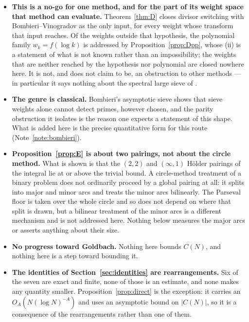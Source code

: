 \documentclass[11pt,a4paper]{article}
\theoremstyle{plain}
\theoremstyle{definition}
\theoremstyle{remark}
\begin{document}
\begin{itemize}
\item \textbf{This is a no-go for one method, and for the part of its
weight space that method can evaluate.} Theorem~\ref{thm:D}
closes divisor switching with Bombieri--Vinogradov as the only input,
for every weight whose transform that input reaches. Of the weights
outside that hypothesis, the polynomial family $w_k=f(\log k)$ is
addressed by Proposition~\ref{prop:Dpp}, whose (ii) is a statement of
what is not known rather than an impossibility; the weights that are
neither reached by the hypothesis nor polynomial are closed nowhere
here. It is not, and does not
claim to be, an obstruction to other methods --- in particular it says
nothing about the spectral large sieve of \cite{Li23}.

\item \textbf{The genre is classical.} Bombieri's asymptotic sieve
\cite{Bom76} shows that sieve weights alone cannot detect primes,
however chosen, and the parity obstruction it isolates is the reason
one expects a statement of this shape. What is added here is the
precise quantitative form for this route
(Note~\ref{note:bombieri}).

\item \textbf{Proposition~\ref{prop:E} is about two pairings, not
about the circle method.} What is shown is that the $(2,2)$ and
$(\infty,1)$ H\"older pairings of the integral lie at or above the
trivial bound. A circle-method treatment of a binary problem does not
ordinarily proceed by a global pairing at all: it splits into major and
minor arcs and treats the minor arcs bilinearly. The Parseval floor is
taken over the whole circle and so does not depend on where that split
is drawn, but a bilinear treatment of the minor arcs is a different
mechanism and is not addressed here. Nothing below measures the major
arcs or asserts anything about their size.

\item \textbf{No progress toward Goldbach.} Nothing here bounds
$C(N)$, and nothing here is a step toward bounding it.

\item \textbf{The identities of Section~\ref{sec:identities} are
rearrangements.} Six of the seven are exact and finite, none of those
is an estimate, and none makes any quantity smaller.
Proposition~\ref{prop:direct} is the exception: it carries an
$O_A(N(\log N)^{-A})$ and uses an asymptotic bound on $|C(N)|$, so it
is a consequence of the rearrangements rather than one of them.
\end{itemize}
\end{document}
